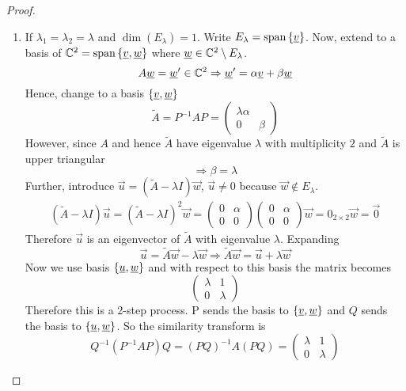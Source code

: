 \documentclass{article}
\numberwithin{equation}{section}
\begin{document}
\begin{proof}
\begin{enumerate}
        \item If $\lambda_1 = \lambda_2 = \lambda$ and $\dim(E_\lambda) = 1$. Write $E_\lambda = \operatorname{span} \left\{ \underline{v} \right\}$. 
        Now, extend to a basis of $\mathbb{C}^2 = \operatorname{span} \left\{ \underline{v}, \underline{w} \right\}$ where $\underline{w} \in \mathbb{C}^2 \setminus E_\lambda$.
        \[
            A \underline{w} = \underline{w}' \in \mathbb{C}^2 \Rightarrow \underline{w}' = \alpha \underline{v} + \beta \underline{w}
        \]
        Hence, change to a basis $\left\{ \underline{v}, \underline{w} \right\}$
        \[
            \tilde{A} = P^{-1} A P = \begin{pmatrix}
                \lambda \alpha \\
                0 & \beta
            \end{pmatrix}
        \]
        However, since $A$ and hence $\tilde{A}$ have eigenvalue $\lambda$ with multiplicity $2$ and $\tilde{A}$ is upper triangular
        \[
            \Rightarrow \beta = \lambda
        \]
        Further, introduce $\vec u = (\tilde{A} - \lambda I)\vec w$, $\vec u \neq 0$ because $\vec w \notin E_\lambda$.
        \begin{align*}
            (\tilde{A} - \lambda I)\vec u = (\tilde{A} - \lambda I)^2\vec w = \begin{pmatrix}
                0 & \alpha \\
                0 & 0
            \end{pmatrix}\begin{pmatrix}
                0 & \alpha \\
                0 & 0
            \end{pmatrix} \vec w = 0_{2 \times 2} \vec w = \vec 0
        \end{align*}
        Therefore $\vec u$ is an eigenvector of $\tilde{A}$ with eigenvalue $\lambda$. Expanding
        \[
            \vec u = \tilde{A}\vec w - \lambda \vec w \Rightarrow \tilde{A}\vec w = \vec u + \lambda \vec w
        \]
        Now we use basis $\left\{ \underline{u}, \underline{w} \right\}$ and with respect to this basis the matrix becomes
        \[
            \begin{pmatrix}
                \lambda & 1 \\
                0 & \lambda
            \end{pmatrix}  
        \]
        Therefore this is a $2$-step process. P sends the basis to $\left\{ \underline{v}, \underline{w} \right\}$ and $Q$ sends the basis to $\left\{ \underline{u}, \underline{w} \right\}$.
        So the similarity transform is
        \[
            Q^{-1}(P^{-1}AP)Q = (PQ)^{-1}A(PQ) = \begin{pmatrix}
                \lambda & 1 \\
                0 & \lambda
            \end{pmatrix}  
        \]
    \end{enumerate}
\end{proof}
\end{document}
